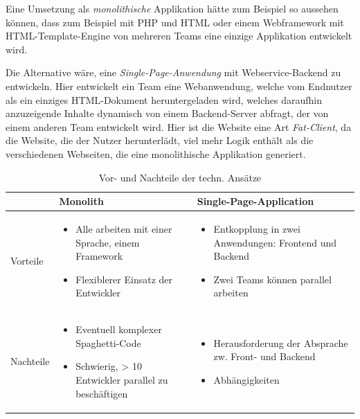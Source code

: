 \documentclass[a4paper, 11pt]{article}
\begin{document}
Eine Umsetzung als \emph{monolithische} Applikation hätte zum Beispiel so
aussehen können, dass zum Beispiel mit PHP und HTML oder einem Webframework mit
HTML-Template-Engine von mehreren Teams eine einzige Applikation entwickelt
wird.

Die Alternative wäre, eine \emph{Single-Page-Anwendung} mit Webservice-Backend
zu entwickeln. Hier entwickelt ein Team eine Webanwendung, welche vom Endnutzer
als ein einziges HTML-Dokument heruntergeladen wird, welches daraufhin
anzuzeigende Inhalte dynamisch von einem Backend-Server abfragt, der von einem
anderen Team entwickelt wird. Hier ist die Website eine Art \emph{Fat-Client},
da die Website, die der Nutzer herunterlädt, viel mehr Logik enthält als die
verschiedenen Webseiten, die eine monolithische Applikation generiert.

\begin{table}
    \centering
    \begin{tabularx}{\textwidth}[htbp]{|l|X|X|}
        \hline
        \rowcolor[HTML]{E0E0E0}
        & \textbf{Monolith} & \textbf{Single-Page-Application}
        \\ \hline
        Vorteile & 
        \begin{itemize}[noitemsep,topsep=0pt,parsep=0pt,partopsep=0pt]
            \item Alle arbeiten mit einer Sprache, einem Framework
            \item Flexiblerer Einsatz der Entwickler
        \end{itemize}
        &
        \begin{itemize}[noitemsep,topsep=0pt,parsep=0pt,partopsep=0pt]
            \item Entkopplung in zwei Anwendungen: Frontend und Backend 
            \item Zwei Teams können parallel arbeiten
        \end{itemize}
        \\ \hline
        Nachteile   &
        \begin{itemize}[noitemsep,topsep=0pt,parsep=0pt,partopsep=0pt]
            \item Eventuell komplexer Spaghetti-Code
            \item Schwierig, > 10 Entwickler parallel zu beschäftigen
        \end{itemize}
        &
        \begin{itemize}[noitemsep,topsep=0pt,parsep=0pt,partopsep=0pt]
            \item Herausforderung der Absprache zw. Front- und Backend
            \item Abhängigkeiten
        \end{itemize}
        \\ \hline
    \end{tabularx}
    \caption{Vor- und Nachteile der techn. Ansätze}
    \label{tab:pro_contra}
\end{table}
\end{document}
